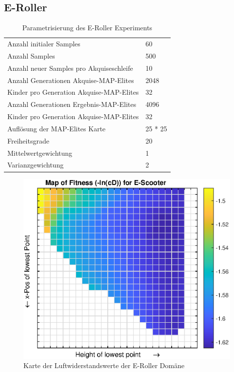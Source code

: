 %

\subsection{E-Roller}

\begin{table}[h]
	\centering
	\begin{tabularx}{.75\textwidth}{ll}\hline
		Anzahl initialer Samples & 60 \\
		Anzahl Samples & 500 \\
		Anzahl neuer Samples pro Akquiseschleife & 10 \\
		Anzahl Generationen Akquise-MAP-Elites & 2048 \\
		Kinder pro Generation Akquise-MAP-Elites & 32 \\
		Anzahl Generationen Ergebnis-MAP-Elites & 4096 \\
		Kinder pro Generation Akquise-MAP-Elites & 32 \\
		Auflösung der MAP-Elites Karte & 25 * 25  \\
		\hline
		Freiheitsgrade & 20 \\
		Mittelwertgewichtung & 1 \\
		Varianzgewichtung & 2 \\
	\end{tabularx}
	\label{tab:parmasEscooter}
	\caption{Parametrisierung des E-Roller Experiments}
\end{table}



\begin{figure}[h]
	\centering
	\includegraphics[width=.7\linewidth]{bilder/escooter/dragMapEscooter}
	\caption{Karte der Luftwiderstandswerte der E-Roller Domäne}
	\label{fig:dragMapEscooter}
\end{figure}

